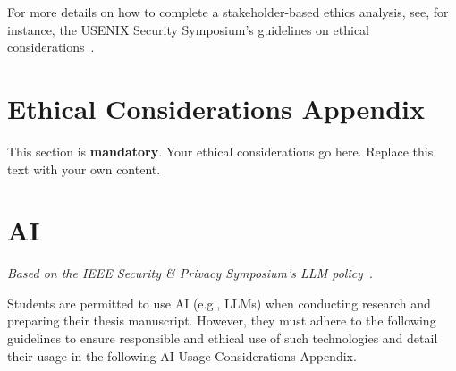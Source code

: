 For more details on how to complete a stakeholder-based ethics analysis, see, for instance, the USENIX Security Symposium's guidelines on ethical considerations~\cite{secethics}.

\section{Ethical Considerations Appendix}
This section is \textbf{mandatory}. Your ethical considerations go here. Replace this text with your own content.

\section*{AI}\label{s:ethical-considerations-appendix}

\emph{Based on the IEEE Security \& Privacy Symposium's LLM policy}~\cite{spai}.

Students are permitted to use AI (e.g., LLMs) when conducting research and preparing their thesis manuscript. However, they must adhere to the following guidelines to ensure responsible and ethical use of such technologies and detail their usage in the following AI Usage Considerations Appendix.

